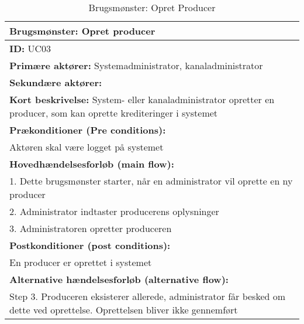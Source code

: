         

\begin{table}[H]
    \begin{tabularx}{\textwidth}{|X|}
        \hline
        \textbf{Brugsmønster:}  Opret producer \\ \hline
        \textbf{ID:} UC03 \\ \hline
        \textbf{Primære aktører:} Systemadministrator, kanaladministrator \\ \hline
        \textbf{Sekundære aktører:} \\ \hline
        \textbf{Kort beskrivelse:} System- eller kanaladministrator opretter en producer, som kan oprette       krediteringer i systemet \\ \hline
        \textbf{Prækonditioner (Pre conditions):} \\
        Aktøren skal være logget på systemet \\ \hline
        \textbf{Hovedhændelsesforløb (main flow):} \\
            1. Dette brugsmønster starter, når en administrator vil oprette en ny producer \\
            2. Administrator indtaster producerens oplysninger \\ 
            3. Administratoren opretter produceren \\ \hline
        \textbf{Postkonditioner (post conditions):} \\
            En producer er oprettet i systemet \\ \hline
        \textbf{Alternative hændelsesforløb (alternative flow):} \\ Step 3. Produceren eksisterer allerede,     administrator får besked om dette ved oprettelse. Oprettelsen bliver ikke gennemført \\
        \hline
    \end{tabularx}
    \caption{Brugsmønster: Opret Producer}
    \label{table:create_producer}
\end{table}


